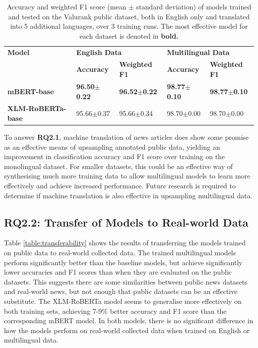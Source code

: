 \documentclass{l4proj}
\begin{document}
\begin{table}[h]
\begin{tabular}{lllll}
\hline
\textbf{Model}   & \multicolumn{2}{l}{\textbf{English Data}} & \multicolumn{2}{l}{\textbf{Multilingual Data}} \\ \cline{2-5} 
                 & \textbf{Accuracy}    & \textbf{Weighted F1}   & \textbf{Accuracy}   & \textbf{Weighted F1}   \\ \hline 
\textbf{mBERT-base}       & \textbf{96.50$\pm$0.22}    & \textbf{96.52$\pm$0.22}          & \textbf{98.77$\pm$0.10}       & \textbf{98.77$\pm$0.10}          \\
\textbf{XLM-RoBERTa-base} & 95.66$\pm$0.37    & 95.66$\pm$0.34          & 98.70$\pm$0.00       & 98.70$\pm$0.00   
     \\ \hline
\end{tabular}
\caption{Accuracy and weighted F1 score (mean $\pm$ standard deviation) of models trained and tested on the Valurank public dataset, both in English only and translated into 5 additional languages, over 3 training runs. The most effective model for each dataset is denoted in \textbf{bold.}}
\label{table:backtranslation-effectiveness}
\end{table}

To answer \textbf{RQ2.1}, machine translation of news articles does show some promise as an effective means of upsampling annotated public data, yielding an improvement in classification accuracy and F1 score over training on the monolingual dataset. For smaller datasets, this could be an effective way of synthesising much more training data to allow multilingual models to learn more effectively and achieve increased performance. Future research is required to determine if machine translation is also effective in upsampling multilingual data.

\subsection{RQ2.2: Transfer of Models to Real-world Data}  \hfill \par

Table \ref{table:transferability} shows the results of transferring the models trained on public data to real-world collected data. The trained multilingual models perform significantly better than the baseline models, but achieve significantly lower accuracies and F1 scores than when they are evaluated on the public datasets. This suggests there are some similarities between public news datasets and real-world news, but not enough that public datasets can be an effective substitute. The XLM-RoBERTa model seems to generalise more effectively on both training sets, achieving 7-9\% better accuracy and F1 score than the corresponding mBERT model. In both models, there is no significant difference in how the models perform on real-world collected data when trained on English or multilingual data.
\end{document}
